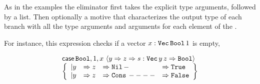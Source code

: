 



As in the examples the \case{} eliminator first takes the explicit type arguments, followed by a \scrut{} list. %
Then optionally a motive that characterizes the output type of each branch with all the type arguments and arguments for each element of the \scruts{}. %

For instance, this \case{} expression checks if a vector $x:\mathtt{Vec}{}\,\mathtt{Bool}{}\,1$ is empty,

\[
  \begin{array}{l}
  \mathsf{case}{}\,\mathtt{Bool}{},1,x\,\left\langle y\Rightarrow z\Rightarrow s:\mathtt{Vec}{}\,y\,z\Rightarrow\mathtt{Bool}{}\right\rangle \\
 \left\{ 
    \begin{array}{llll}
    | y&\Rightarrow z&\Rightarrow \mathtt{Nil}{}\,-&\Rightarrow \mathtt{True}{} \\
    | y&\Rightarrow z&\Rightarrow \mathtt{Cons}{}\,----&\Rightarrow \mathtt{False}{}
    \end{array}
    \right\} 
\end{array}
\]

